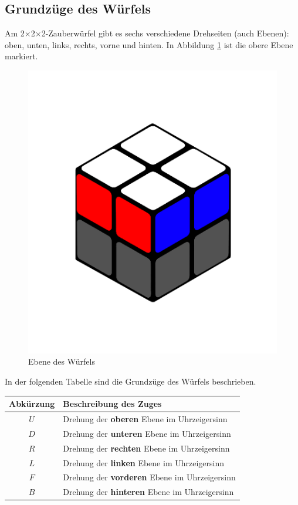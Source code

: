 \documentclass[12pt,a4paper, usenames, dvipsnames]{article}
\theoremstyle{mystyle}
\theoremstyle{definition}
\newcommand{\Ttwo}{2$\times$2$\times$2-}
\begin{document}
\subsection{Grundzüge des Würfels} 

\label{Abschnitt_GrundzügeWürfel}
Am \Ttwo Zauberwürfel gibt es sechs verschiedene Drehseiten (auch Ebenen): oben, unten, links, rechts, vorne und hinten. 
In Abbildung \ref{Abbildung_Ebene} ist die obere Ebene markiert.

\begin{figure}[H]
\centering
\includegraphics[scale=0.1]{ebene.png}
\caption[Ebene des Würfels]{Ebene des Würfels}
\label{Abbildung_Ebene}
\end{figure}

In der folgenden Tabelle sind die Grundzüge des Würfels beschrieben.

\begin{center}
\begin{tabular}{cl}
\toprule
\textbf{Abkürzung} & \textbf{Beschreibung des Zuges} \\
\midrule
$U$ & Drehung der \textbf{oberen} Ebene im Uhrzeigersinn \\
$D$ & Drehung der \textbf{unteren} Ebene im Uhrzeigersinn \\
$R$ & Drehung der \textbf{rechten} Ebene im Uhrzeigersinn \\
$L$ & Drehung der \textbf{linken} Ebene im Uhrzeigersinn \\
$F$ & Drehung der \textbf{vorderen} Ebene im Uhrzeigersinn \\
$B$ & Drehung der \textbf{hinteren} Ebene im Uhrzeigersinn \\
\bottomrule
\end{tabular} 
\end{center}
\end{document}
